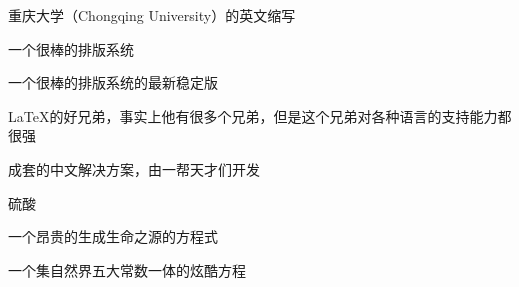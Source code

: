 \begin{denotation}
\item[CQU] 重庆大学（Chongqing University）的英文缩写
\item[\LaTeX] 一个很棒的排版系统
\item[\LaTeXe] 一个很棒的排版系统的最新稳定版
\item[\XeTeX] \LaTeX{}的好兄弟，事实上他有很多个兄弟，但是这个兄弟对各种语言的支持能力都很强
\item[\CTeX] 成套的中文\XeTeX{}解决方案，由一帮天才们开发
\item[\ce{H2SO4}] 硫酸
\item[\ce{2H2 + O2 -> 2H2O}] 一个昂贵的生成生命之源的方程式
\item[$ e^{\pi\cdot{}i}+1=0$] 一个集自然界五大常数一体的炫酷方程
\end{denotation}